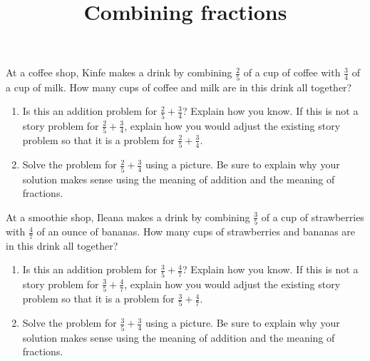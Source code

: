 \documentclass[nooutcomes,noauthor]{ximera}
\title{Combining fractions}
\begin{document}
\begin{abstract}
\end{abstract}

\maketitle



\begin{problem}
At a coffee shop, Kinfe makes a drink by combining $\frac{2}{5}$ of a cup of coffee with $\frac{3}{4}$ of a cup of milk. How many cups of coffee and milk are in this drink all together?

\begin{enumerate}
	\item Is this an addition problem for $\frac{2}{5} + \frac{3}{4}$? Explain how you know.  If this is not a story problem for $\frac{2}{5} + \frac{3}{4}$, explain how you would adjust the existing story problem so that it is a problem for $\frac{2}{5} + \frac{3}{4}$.
	\item Solve the problem for $\frac{2}{5} + \frac{3}{4}$ using a picture. Be sure to explain why your solution makes sense using the meaning of addition and the meaning of fractions.
\end{enumerate}
\end{problem}



\begin{problem}
At a smoothie shop, Ileana makes a drink by combining $\frac{3}{5}$ of a cup of strawberries with $\frac{4}{7}$ of an ounce of bananas. How many cups of strawberries and bananas are in this drink all together?

\begin{enumerate}
	\item Is this an addition problem for $\frac{3}{5} + \frac{4}{7}$? Explain how you know.  If this is not a story problem for $\frac{3}{5} + \frac{4}{7}$, explain how you would adjust the existing story problem so that it is a problem for $\frac{3}{5} + \frac{4}{7}$.
	\item Solve the problem for $\frac{3}{5} + \frac{3}{4}$ using a picture. Be sure to explain why your solution makes sense using the meaning of addition and the meaning of fractions.
\end{enumerate}
\end{problem}
\end{document}
